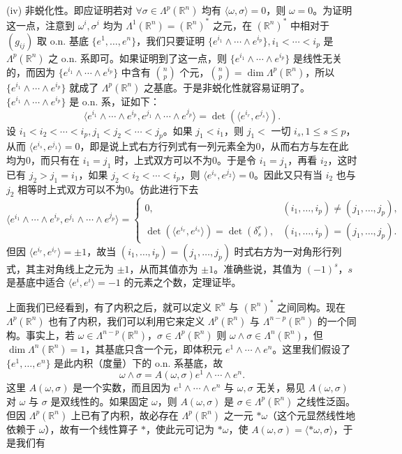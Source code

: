 (iv) 非蜕化性。即应证明若对 $\forall\sigma\in\Lambda^p(\mathbb R^n)$ 均有 $\langle\omega,\sigma\rangle=0$，则 $\omega=0$。为证明这一点，注意到 $\omega^i,\sigma^i$ 均为 $\Lambda^1(\mathbb R^n)=(\mathbb R^n)^*$ 之元，在 $(\mathbb R^n)^*$ 中相对于 $(g_{ij})$ 取 o.n. 基底 $\{e^1,\ldots,e^n\}$，我们只要证明 $\{e^{i_1}\wedge\cdots\wedge e^{i_p}\},i_1<\cdots<i_p$ 是 $\Lambda^p(\mathbb R^n)$ 之 o.n. 系即可。如果证明到了这一点，则 $\{e^{i_1}\wedge\cdots\wedge e^{i_p}\}$ 是线性无关的，而因为 $\{e^{i_1}\wedge\cdots\wedge e^{i_p}\}$ 中含有 $\binom np$ 个元，$\binom np=\dim\Lambda^p(\mathbb R^n)$，所以 $\{e^{i_1}\wedge\cdots\wedge e^{i_p}\}$ 就成了 $\Lambda^p(\mathbb R^n)$ 之基底。于是非蜕化性就容易证明了。$\{e^{i_1}\wedge\cdots\wedge e^{i_p}\}$ 是 o.n. 系，证如下：
\[
 \langle e^{i_1}\wedge\cdots\wedge e^{i_p},e^{j_1}\wedge\cdots\wedge e^{j_p}\rangle
 =\det(\langle e^{i_r},e^{j_s}\rangle).
\]
设 $i_1<i_2<\cdots<i_p,j_1<j_2<\cdots<j_p$。如果 $j_1<i_1$，则 $j_1< $ 一切 $i_s,1\le s\le p$，从而 $\langle e^{i_s},e^{j_1}\rangle=0$，即是说上式右方行列式有一列元素全为0，从而右方与左在此均为0，而只有在 $i_1=j_1$ 时，上式双方可以不为0。于是令 $i_1=j_1$，再看 $i_2$，这时已有 $j_2>j_1=i_1$，如果 $j_2<i_2<\cdots<i_p$，则 $\langle e^{i_s},e^{j_2}\rangle=0$。因此又只有当 $i_2$ 也与 $j_2$ 相等时上式双方可以不为0。仿此进行下去
\[
 \langle e^{i_1}\wedge\cdots\wedge e^{i_p},e^{j_1}\wedge\cdots\wedge e^{j_p}\rangle
 =\begin{cases}
 0,&(i_1,\ldots,i_p)\ne(j_1,\ldots,j_p),\\
 \det(\langle e^{i_r},e^{i_s}\rangle)=\det(\delta^r_s),&(i_1,\ldots,i_p)=(j_1,\ldots,j_p).
 \end{cases}
\]
但因 $\langle e^{i_r},e^{i_r}\rangle=\pm1$，故当 $(i_1,\ldots,i_p)=(j_1,\ldots,j_p)$ 时式右方为一对角形行列式，其主对角线上之元为 $\pm1$，从而其值亦为 $\pm1$。准确些说，其值为 $(-1)^s$，$s$ 是基底中适合 $\langle e^i,e^i\rangle=-1$ 的元素之个数，定理证毕。

上面我们已经看到，有了内积之后，就可以定义 $\mathbb R^n$ 与 $(\mathbb R^n)^*$ 之间同构。现在 $\Lambda^p(\mathbb R^n)$ 也有了内积，我们可以利用它来定义 $\Lambda^p(\mathbb R^n)$ 与 $\Lambda^{n-p}(\mathbb R^n)$ 的一个同构。事实上，若 $\omega\in\Lambda^{n-p}(\mathbb R^n)$，$\sigma\in\Lambda^p(\mathbb R^n)$ 则 $\omega\wedge\sigma\in\Lambda^n(\mathbb R^n)$，但 $\dim\Lambda^n(\mathbb R^n)=1$，其基底只含一个元，即体积元 $e^1\wedge\cdots\wedge e^n$。这里我们假设了 $\{e^1,\ldots,e^n\}$ 是此内积（度量）下的 o.n. 系基底，故
\[
 \omega\wedge\sigma=A(\omega,\sigma)e^1\wedge\cdots\wedge e^n.
\]
这里 $A(\omega,\sigma)$ 是一个实数，而且因为 $e^1\wedge\cdots\wedge e^n$ 与 $\omega,\sigma$ 无关，易见 $A(\omega,\sigma)$ 对 $\omega$ 与 $\sigma$ 是双线性的。如果固定 $\omega$，则 $A(\omega,\sigma)$ 是 $\sigma\in\Lambda^p(\mathbb R^n)$ 之线性泛函。但因 $\Lambda^p(\mathbb R^n)$ 上已有了内积，故必存在 $\Lambda^p(\mathbb R^n)$ 之一元 $*\omega$（这个元显然线性地依赖于 $\omega$），故有一个线性算子 $*$，使此元可记为 $*\omega$，使 $A(\omega,\sigma)=\langle*\omega,\sigma\rangle$，于是我们有


